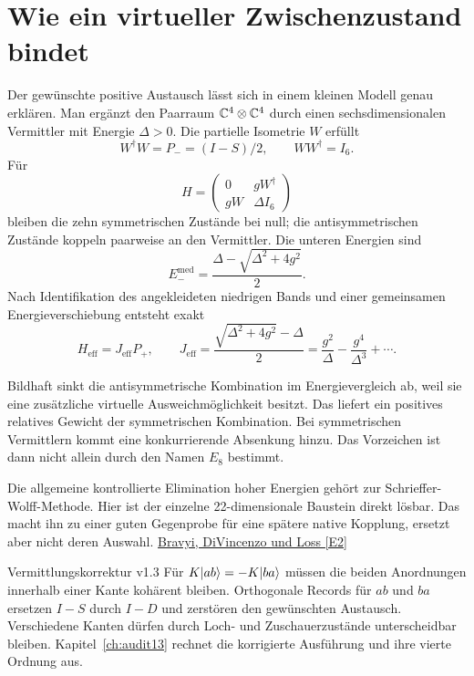 \section{Wie ein virtueller Zwischenzustand bindet}
Der gewünschte positive Austausch lässt sich in einem kleinen Modell genau erklären. Man ergänzt den Paarraum $\mathbb C^4\otimes\mathbb C^4$ durch einen sechsdimensionalen Vermittler mit Energie $\Delta>0$. Die partielle Isometrie $W$ erfüllt
\begin{equation}
W^\dagger W=P_-=(I-S)/2,\qquad WW^\dagger=I_6.
\end{equation}
Für
\begin{equation}
H=\begin{pmatrix}0&gW^\dagger\\gW&\Delta I_6\end{pmatrix}
\end{equation}
bleiben die zehn symmetrischen Zustände bei null; die antisymmetrischen Zustände koppeln paarweise an den Vermittler. Die unteren Energien sind
\begin{equation}
E_-^{\mathrm{med}}=\frac{\Delta-\sqrt{\Delta^2+4g^2}}2.
\end{equation}
Nach Identifikation des angekleideten niedrigen Bands und einer gemeinsamen Energieverschiebung entsteht exakt
\begin{equation}
H_{\mathrm{eff}}=J_{\mathrm{eff}}P_+,\qquad
J_{\mathrm{eff}}=\frac{\sqrt{\Delta^2+4g^2}-\Delta}{2}
=\frac{g^2}{\Delta}-\frac{g^4}{\Delta^3}+\cdots.
\end{equation}

Bildhaft sinkt die antisymmetrische Kombination im Energievergleich ab, weil sie eine zusätzliche virtuelle Ausweichmöglichkeit besitzt. Das liefert ein positives relatives Gewicht der symmetrischen Kombination. Bei symmetrischen Vermittlern kommt eine konkurrierende Absenkung hinzu. Das Vorzeichen ist dann nicht allein durch den Namen $E_8$ bestimmt.

Die allgemeine kontrollierte Elimination hoher Energien gehört zur Schrieffer-Wolff-Methode. Hier ist der einzelne 22-dimensionale Baustein direkt lösbar. Das macht ihn zu einer guten Gegenprobe für eine spätere native Kopplung, ersetzt aber nicht deren Auswahl. \href{https://arxiv.org/abs/1105.0675}{Bravyi, DiVincenzo und Loss [E2]}

\begin{grenze}{Vermittlungskorrektur v1.3}
Für $K\lvert ab\rangle=-K\lvert ba\rangle$ müssen die beiden Anordnungen innerhalb einer Kante kohärent bleiben. Orthogonale Records für $ab$ und $ba$ ersetzen $I-S$ durch $I-D$ und zerstören den gewünschten Austausch. Verschiedene Kanten dürfen durch Loch- und Zuschauerzustände unterscheidbar bleiben. Kapitel~\ref{ch:audit13} rechnet die korrigierte Ausführung und ihre vierte Ordnung aus.
\end{grenze}
